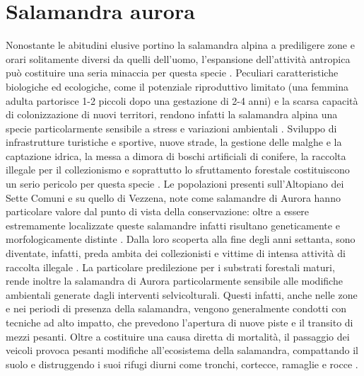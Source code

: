 \documentclass[10pt,twoside,openany,x11names,svgnames,italian,a5paper,dvipsnames,table]{memoir}
\begin{document}
\section{Salamandra aurora}
Nonostante le abitudini elusive portino la salamandra alpina a prediligere zone e orari solitamente diversi da quelli dell’uomo, l’espansione dell’attività antropica può costituire una seria minaccia per questa specie \cite{AAVV11b} \cite{Bellon08b} \cite{Bonato07}. Peculiari caratteristiche biologiche ed ecologiche, come il potenziale riproduttivo limitato (una femmina adulta partorisce 1-2 piccoli dopo una gestazione di 2-4 anni) e la scarsa capacità di colonizzazione di nuovi territori, rendono infatti la salamandra alpina una specie particolarmente sensibile a stress e variazioni ambientali \cite{NISORIA}. Sviluppo di infrastrutture turistiche e sportive, nuove strade, la gestione delle malghe e la captazione idrica, la messa a dimora di boschi artificiali di conifere, la raccolta illegale per il collezionismo e soprattutto lo sfruttamento forestale costituiscono un serio pericolo per questa specie \cite{Bonato07}. Le popolazioni presenti sull'Altopiano dei Sette Comuni e su quello di Vezzena, note come salamandre di Aurora hanno particolare valore dal punto di vista della conservazione: oltre a essere estremamente localizzate queste salamandre infatti risultano geneticamente e morfologicamente distinte \cite{Trevisan82}. Dalla loro scoperta alla fine degli anni settanta, sono diventate, infatti, preda ambita dei collezionisti e vittime di intensa attività di raccolta illegale \cite{Rondinini13}.  
La particolare predilezione per i substrati forestali maturi, rende inoltre la salamandra di Aurora particolarmente sensibile alle modifiche ambientali generate dagli interventi selvicolturali. Questi infatti, anche nelle zone e nei periodi di presenza della salamandra, vengono generalmente condotti con tecniche ad alto impatto, che prevedono l’apertura di nuove piste e il transito di mezzi pesanti. Oltre a costituire una causa diretta di mortalità, il passaggio dei veicoli provoca pesanti modifiche all’ecosistema della salamandra, compattando il suolo e distruggendo i suoi rifugi diurni come tronchi, cortecce, ramaglie e rocce \cite{Beukema08} \cite{Romanazzi12}.
\end{document}
